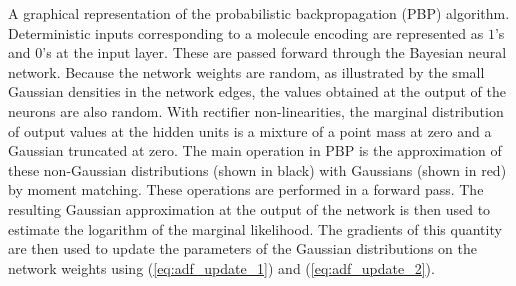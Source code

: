 A graphical representation of the probabilistic backpropagation (PBP)
algorithm. Deterministic inputs corresponding to a molecule encoding are represented as $1$'s and $0$'s at the input
layer. These are passed forward through the Bayesian neural network. Because the network weights are random, as illustrated
by the small Gaussian densities in the network edges, the values obtained at the output of the
neurons are also random. With rectifier non-linearities, the marginal distribution of output values at the hidden units is a mixture
of a point mass at zero and a Gaussian truncated at zero. 
The main operation in PBP is the approximation of
these non-Gaussian distributions (shown in black) with Gaussians (shown in red) by moment matching. These
operations are performed in a forward pass. The resulting Gaussian
approximation at the output of the network is then used to estimate the
logarithm of the marginal likelihood. The gradients of this quantity are then
used to update the parameters of the Gaussian distributions on the network
weights using (\ref{eq:adf_update_1}) and (\ref{eq:adf_update_2}).
\label{fig:pbp}